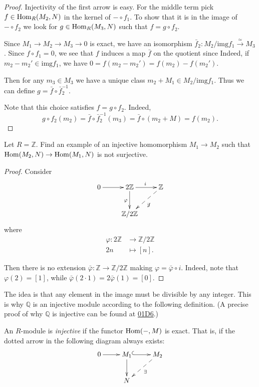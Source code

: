 \begin{proof}
Injectivity of the first arrow is easy.
For the middle term pick $f \in
\mathop{\mathrm{Hom}}\nolimits_R(M_2,N)$
in the kernel of $- \circ f_1$.
To show that it is in the image of $-\circ
f_2$
we look for $g \in \mathop{\mathrm{Hom}}\nolimits_R(M_3,N)$
such that $f=g\circ f_2$.

Since $M_1 \to M_2 \to M_3 \to 0$
is exact, we have an isomorphism
$\bar{f}_2:M_2/\text{img}f_1
\xrightarrow{\simeq} M_3$.
Since $f \circ f_1=0$, we see that $f$
induces a map $\bar{f}$ on the quotient since
Indeed, if $m_2-m_2' \in \text{img}f_1$,
we have $0=f(m_2-m_2')=f(m_2)-f(m_2')$.

Then for any $m_3 \in M_3$
we have a unique class $m_2 + M_1 \in
M_2/\text{img}f_1$.
Thus we can define $g = \bar{f} \circ
\bar{f}_2^{-1}$.

Note that this choice satisfies $f = g \circ
f_2$.
Indeed,
$$
g\circ f_2(m_2)=\bar{f} \circ
\bar{f}^{-1}_2(m_3)
= \bar{f} \circ (m_2+M)
=f(m_2).
$$
\end{proof}

\begin{exercise}
\label{exercise-count-right-hom-not-right}
Let $R = \mathbb{Z}$.
Find an example of an injective homomorphism
$M_1 \to M_2$ such that $\mathop{\mathrm{Hom}}\nolimits(M_2,N) \to
\mathop{\mathrm{Hom}}\nolimits(M_1,N)$
is not surjective.
\end{exercise}

\begin{proof}
Consider
$$
\xymatrix{
0\ar[r]
&2\mathbb{Z}\ar[r]^i\ar[d]_\varphi
&\mathbb{Z}\ar@{-->}[dl]^{\not\exists}\\
&\mathbb{Z}/2\mathbb{Z}
}
$$
where
$$
\begin{aligned}
\varphi: 2\mathbb{Z} &\longrightarrow
\mathbb{Z}/2\mathbb{Z} \\
2n &\longmapsto [n].
\end{aligned}
$$

\noindent
Then there is no extension
$\bar{\varphi}:\mathbb{Z} \to
\mathbb{Z}/2\mathbb{Z}$
making $\varphi=\bar{\varphi} \circ i$.
Indeed, note that $\varphi(2)=[1]$,
while $\bar{\varphi}(2\cdot
1)=2\bar{\varphi}(1)=[0]$.
\end{proof}

\noindent
The idea is that any element in the image
must be divisible
by any integer. This is why $\mathbb{Q}$ is
an injective module
according to the following definition.
(A precise proof of why $\mathbb{Q}$ is
injective
can be found at
\href{https://stacks.math.columbia.edu/tag/%
01D6}{01D6}.)

\begin{definition}
\label{definition-injective-module}
An $R$-module is {\it injective} if the
functor $\mathop{\mathrm{Hom}}\nolimits(-,M)$
is exact.
That is, if the dotted arrow in the following
diagram always exists:
$$
\xymatrix{
0\ar[r]
&M_1\ar@{^{(}->}[r]\ar[d]
&M_2\ar@{-->}[dl]^{\exists}\\
&N
}
$$
\end{definition}

